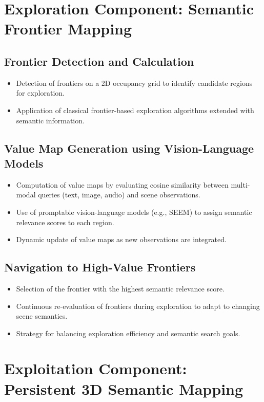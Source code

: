 \section{Exploration Component: Semantic Frontier Mapping}
\subsection{Frontier Detection and Calculation}
\begin{itemize}
    \item Detection of frontiers on a 2D occupancy grid to identify candidate regions for exploration.
    \item Application of classical frontier-based exploration algorithms extended with semantic information.
\end{itemize}

\subsection{Value Map Generation using Vision-Language Models}
\begin{itemize}
    \item Computation of value maps by evaluating cosine similarity between multi-modal queries (text, image, audio) and scene observations.
    \item Use of promptable vision-language models (e.g., SEEM) to assign semantic relevance scores to each region.
    \item Dynamic update of value maps as new observations are integrated.
\end{itemize}

\subsection{Navigation to High-Value Frontiers}
\begin{itemize}
    \item Selection of the frontier with the highest semantic relevance score.
    \item Continuous re-evaluation of frontiers during exploration to adapt to changing scene semantics.
    \item Strategy for balancing exploration efficiency and semantic search goals.
\end{itemize}

\section{Exploitation Component: Persistent 3D Semantic Mapping}

